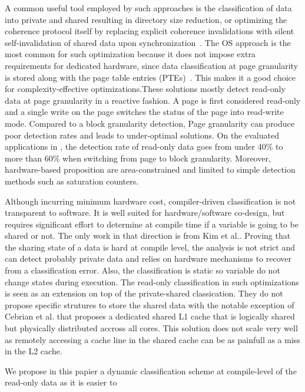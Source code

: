 \documentclass[sigconf]{acmart}
\begin{document}
A common useful tool employed by such approaches is the classification of data into private and shared\cite{Ros:2012}\cite{Cuesta:2013} resulting in directory size reduction, or optimizing the coherence protocol itself by replacing explicit coherence invalidations with silent self-invalidation of shared data upon synchronization~\cite{Ros:2012}. The OS approach is the most common for such optimization because it does not impose extra requirements for dedicated hardware, since data classification at page granularity is stored along with the page table entries (PTEs)~\cite{Hardavellas:2009}. This makes it a good choice for complexity-effective optimizations.These solutions mostly detect read-only data at page granularity in a reactive fashion. A page is first considered read-only and a single write on the page switches the status of the page into read-write mode. Compared to a block granularity detection, Page granularity can produce poor detection rates and leads to under-optimal solutions. On the evaluated applications in \cite{Cuesta:2013}, the detection rate of read-only data goes from under 40\% to more than 60\% when switching from page to block granularity. Moreover, hardware-based proposition are area-constrained and limited to simple detection methods such as saturation counters. 

Although incurring minimum hardware cost, compiler-driven classification is not transparent to software. It is well suited for hardware/software co-design, but requires significant effort to determine at compile time if a variable is going to be shared or not. The only work in that direction is from Kim et al.\cite{Kim:2010}. Proving that the sharing state of a data is hard at compile level, the analysis is not strict and can detect probably private data and relies on hardware mechanisms to recover from a classification error. Also, the classification is static so variable do not change states during execution. 
The read-only classification in such optimizations is seen as an extension on top of the private-shared classication. They do not propose specific strutures to store the shared data with the notable exception of Cebrian et al.\cite{cebrian:2017} that proposes a dedicated shared L1 cache that is logically shared but physically distributed accross all cores. This solution does not scale very well as remotely accessing a cache line in the shared cache can be as painfull as a miss in the L2 cache. 

We propose in this papier a dynamic classification scheme at compile-level of the read-only data as it is easier to 
\end{document}
